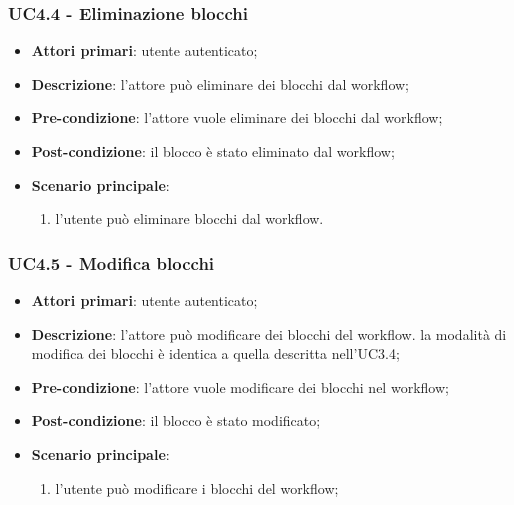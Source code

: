 \subsubsection{UC4.4 - Eliminazione blocchi}

\begin{itemize}
\item \textbf{Attori primari}: utente autenticato;

\item \textbf{Descrizione}: l'attore può eliminare dei blocchi dal workflow;

\item \textbf{Pre-condizione}: l'attore vuole eliminare dei blocchi dal workflow;

\item \textbf{Post-condizione}: il blocco è stato eliminato dal workflow;

\item \textbf{Scenario principale}:
\begin{enumerate}
\item l'utente può eliminare blocchi dal workflow.
\end{enumerate}
\end{itemize}

\subsubsection{UC4.5 - Modifica blocchi}

\begin{itemize}
\item \textbf{Attori primari}: utente autenticato;

\item \textbf{Descrizione}: l'attore può modificare dei blocchi del workflow. la modalità di modifica dei blocchi è identica a quella descritta nell'UC3.4;

\item \textbf{Pre-condizione}: l'attore vuole modificare dei blocchi nel workflow;

\item \textbf{Post-condizione}: il blocco è stato modificato;

\item \textbf{Scenario principale}:
\begin{enumerate}
\item l'utente può modificare i blocchi del workflow;
\end{enumerate}
\end{itemize}

